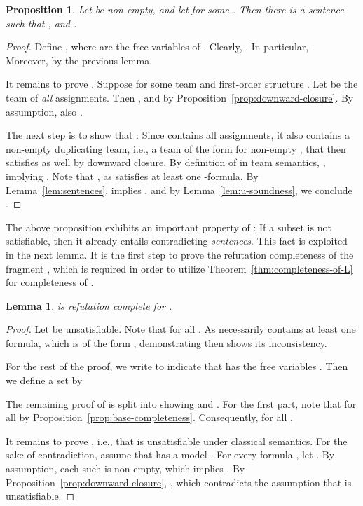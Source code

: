\documentclass[a4paper,english,fleqn,11pt,final]{scrartcl}
\makeatletter
\newcommand{\ie}{i.e.\@\xspace}
\theoremstyle{plain}
\newtheorem{proposition}[theorem]{Proposition}
\newtheorem{lemma}[theorem]{Lemma}
\theoremstyle{definition}
\makeatother
\begin{document}
\begin{proposition}
Let  be non-empty, and let  for some .
Then there is a sentence  such that ,  and .
\end{proposition}
\begin{proof}
Define , where  are the free variables of .
Clearly, .
In particular, .
Moreover,  by the previous lemma.

It remains to prove .
Suppose  for some team  and first-order structure .
Let  be the team of \emph{all} assignments.
Then , and  by Proposition~\ref{prop:downward-closure}.
By assumption, also .

The next step is to show that : Since  contains all assignments, it also contains a non-empty duplicating team, \ie, a team of the form  for non-empty , that then satisfies  as well by downward closure.
By definition of  in team semantics, , implying .
Note that , as  satisfies at least one -formula.
By Lemma~\ref{lem:sentences},   implies , and by Lemma~\ref{lem:u-soundness}, we conclude .
\end{proof}

The above proposition exhibits an important property of : If a subset  is not satisfiable, then it already entails contradicting \emph{sentences}.
This fact is exploited in the next lemma.
It is the first step to prove the refutation completeness of the fragment , which is required in order to utilize Theorem~\ref{thm:completeness-of-L} for completeness of .


\begin{lemma}\label{lem:negg-fo-completeness}
 is refutation complete for .
\end{lemma}
\begin{proof}
Let  be unsatisfiable.
Note that  for all .
As  necessarily contains at least one formula, which is of the form , demonstrating  then shows its inconsistency.

For the rest of the proof, we write  to indicate that  has the free variables .
Then we define a set  by

The remaining proof of  is split into showing  and .
For the first part, note that  for all  by Proposition~\ref{prop:base-completeness}.
Consequently, for all ,


It remains to prove , \ie, that  is unsatisfiable under classical semantics.
For the sake of contradiction, assume that  has a model .
For every formula , let .
By assumption, each such  is non-empty, which implies .
By Proposition~\ref{prop:downward-closure}, , which contradicts the assumption that  is unsatisfiable.
\end{proof}
\end{document}
